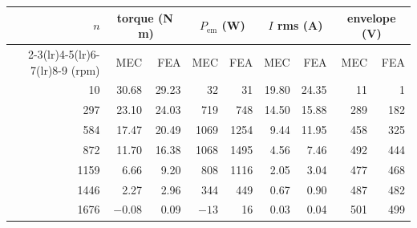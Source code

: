 \documentclass[10pt,a4paper,twocolumn]{article}
\theoremstyle{plain}
\theoremstyle{remark}
\begin{document}
\begin{table}[!t]
\centering
\footnotesize
\begin{threeparttable}
\begin{tabular}{rrrrrrrrr}
\toprule
$n$ & \multicolumn{2}{c}{torque (N\,m)} & \multicolumn{2}{c}{$P_{\mathrm{em}}$ (W)}
    & \multicolumn{2}{c}{$I$ rms (A)} & \multicolumn{2}{c}{envelope (V)}\\
\cmidrule(lr){2-3}\cmidrule(lr){4-5}\cmidrule(lr){6-7}\cmidrule(lr){8-9}
(rpm) & MEC & FEA & MEC & FEA & MEC & FEA & MEC & FEA \\
\midrule
10\tnote{a}   & 30.68 & 29.23 & 32   & 31   & 19.80 & 24.35 & 11  & 1   \\
297  & 23.10 & 24.03 & 719  & 748  & 14.50 & 15.88 & 289 & 182 \\
584  & 17.47 & 20.49 & 1069 & 1254 & 9.44  & 11.95 & 458 & 325 \\
872  & 11.70 & 16.38 & 1068 & 1495 & 4.56  & 7.46  & 492 & 444 \\
1159 & 6.66  & 9.20  & 808  & 1116 & 2.05  & 3.04  & 477 & 468 \\
1446 & 2.27  & 2.96  & 344  & 449  & 0.67  & 0.90  & 487 & 482 \\
1676 & $-0.08$ & 0.09 & $-13$ & 16 & 0.03  & 0.04  & 501 & 499 \\
\bottomrule
\end{tabular}

\vspace{3mm}


\end{threeparttable}
\end{table}
\end{document}
